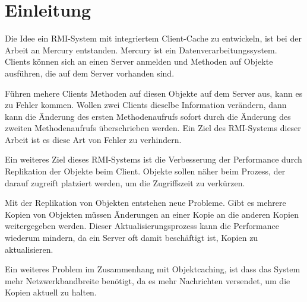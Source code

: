 \chapter{Einleitung}

Die Idee ein RMI-System mit integriertem Client-Cache zu entwickeln, ist bei der Arbeit an Mercury entstanden. Mercury ist ein Datenverarbeitungssystem. Clients können sich an einen Server anmelden und Methoden auf Objekte ausführen, die auf dem Server vorhanden sind. 

Führen mehere Clients Methoden auf diesen Objekte auf dem Server aus, kann es zu Fehler kommen. Wollen zwei Clients dieselbe Information verändern, dann kann die Änderung des ersten Methodenaufrufs sofort durch die Änderung des zweiten Methodenaufrufs überschrieben werden. Ein Ziel des RMI-Systems dieser Arbeit ist es diese Art von Fehler zu verhindern.

Ein weiteres Ziel dieses RMI-Systems ist die Verbesserung der Performance durch Replikation der Objekte beim Client. Objekte sollen näher beim Prozess, der darauf zugreift platziert werden, um die Zugriffszeit zu verkürzen.

Mit der Replikation von Objekten entstehen neue Probleme. Gibt es mehrere Kopien von Objekten müssen Änderungen an einer Kopie an die anderen Kopien weitergegeben werden. Dieser Aktualisierungsprozess kann die Performance wiederum mindern, da ein Server oft damit beschäftigt ist, Kopien zu aktualisieren.

Ein weiteres Problem im Zusammenhang mit Objektcaching, ist dass das System mehr Netzwerkbandbreite benötigt, da es mehr Nachrichten versendet, um die Kopien aktuell zu halten.
